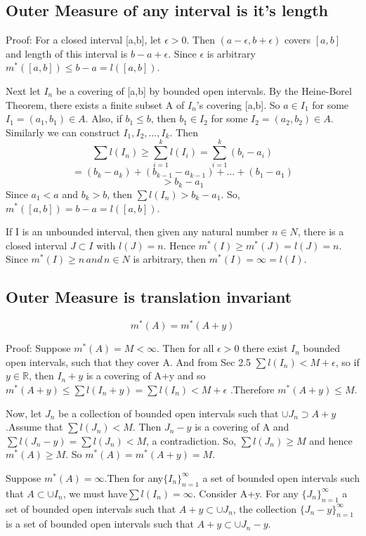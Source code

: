 \documentclass{article}
\begin{document}
\subsection{Outer Measure of any interval is it's length}

Proof:  
For a closed interval [a,b], let $\epsilon >0$. Then $(a-\epsilon,b+\epsilon)$ covers $[a,b]$ and length of this interval is $b-a+\epsilon$. Since $\epsilon$ is arbitrary $m^*([a,b]) \leq b-a = l([a,b])$.\medskip

Next let ${I_n}$ be a covering of [a,b] by bounded open intervals. By the Heine-Borel Theorem, there exists a finite subset A of $I_n$'s covering [a,b]. So $a \in I_1$ for some $I_1 =(a_1,b_1) \in A$. Also, if $b_1 \leq b$, then $b_1 \in I_2 $ for some $I_2 =(a_2,b_2) \in A$. Similarly we can construct $I_1,I_2,\dots,I_k$. Then
$$ \sum l(I_n) \geq \sum_{i=1}^k l(I_i) = \sum_{i=1}^{k}(b_i - a_i)$$
$$=(b_k-a_k) +(b_{k-1} -a_{k-1})+ \dots + (b_1 - a_1) $$
$$ >b_k -a_1$$
Since $a_1<a$ and $b_k>b$, then $ \sum l(I_n) > b_k -a_1 $. So, $m^*([a,b]) = b-a = l([a,b])$.\medskip

If I is an unbounded interval, then given any natural number $n \in N$, there is a closed interval $J \subset I$ with $l(J)=n$. Hence $m^*(I) \geq m^*(J) = l(J)=n$. Since $m^*(I) \geq n \, and \, n \in N$ is arbitrary, then $m^*(I)=\infty=l(I)$. 

\subsection{Outer Measure is translation invariant}
$$m^*(A)=m^*(A+y)$$

Proof: Suppose $m^*(A) = M < \infty$. Then for all $\epsilon > 0 $ there exist ${I_n}$ bounded open intervals, such that they cover A. And from Sec 2.5 $\sum l(I_n) < M+ \epsilon$, so if $y \in \mathbb{R}$, then ${I_{n}+y}$ is a covering of A+y and so $m^{*}(A+y) \leq \sum l(I_n + y ) = \sum l(I_n) < M + \epsilon$ .Therefore $m^*(A+y) \leq M$.\medskip

Now, let ${J_n}$ be a collection of bounded open intervals such that $\cup J_n \supset A+y $.Assume that $\sum l(J_n)< M$. Then ${J_n-y}$ is a covering of A and $\sum l(J_n-y)=\sum l(J_n) < M$, a contradiction. So, $\sum l(J_n) \geq M$ and hence $m^*(A)\geq M$. So $m^*(A)=m^*(A+y)=M$.\medskip

Suppose $m^*(A)= \infty$.Then for any$\{I_n\}_{n=1}^{\infty} $ a set of bounded open intervals such that $A \subset \cup I_n$, we must
have$\sum l(I_n) =\infty$. Consider A+y. For any $\{J_n\}_{n=1}^{\infty} $ a set of bounded open intervals such that $A+y \subset \cup J_n$, the collection $\{J_n - y\}_{n=1}^{\infty} $ is a set of bounded open intervals such that $A+y \subset \cup J_n -y$. \smallskip
\end{document}
